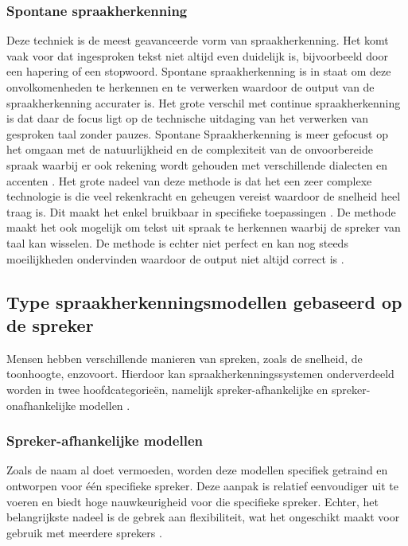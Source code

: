 \subsubsection{Spontane spraakherkenning}
Deze techniek is de meest geavanceerde vorm van spraakherkenning. Het komt vaak voor dat ingesproken tekst niet altijd even duidelijk is, bijvoorbeeld door een hapering of een stopwoord. Spontane spraakherkenning is in staat om deze onvolkomenheden te herkennen en te verwerken waardoor de output van de spraakherkenning accurater is. Het grote verschil met continue spraakherkenning is dat daar de focus ligt op de technische uitdaging van het verwerken van gesproken taal zonder pauzes. Spontane Spraakherkenning is meer gefocust op het omgaan met de natuurlijkheid en de complexiteit van de onvoorbereide spraak waarbij er ook rekening wordt gehouden met verschillende dialecten en accenten \autocite{Vimala2012}. Het grote nadeel van deze methode is dat het een zeer complexe technologie is die veel rekenkracht en geheugen vereist waardoor de snelheid heel traag is. Dit maakt het enkel bruikbaar in specifieke toepassingen \autocite{Hori2005}. De methode maakt het ook mogelijk om tekst uit spraak te herkennen waarbij de spreker van taal kan wisselen. De methode is echter niet perfect en kan nog steeds moeilijkheden ondervinden waardoor de output niet altijd correct is \autocite{Hori2005}.



\subsection{Type spraakherkenningsmodellen gebaseerd op de spreker}
Mensen hebben verschillende manieren van spreken, zoals de snelheid, de toonhoogte, enzovoort. Hierdoor kan spraakherkenningssystemen onderverdeeld worden in twee hoofdcategorieën, namelijk spreker-afhankelijke en spreker-onafhankelijke modellen \autocite{Vimala2012}.

\subsubsection{Spreker-afhankelijke modellen}
Zoals de naam al doet vermoeden, worden deze modellen specifiek getraind en ontworpen voor één specifieke spreker. Deze aanpak is relatief eenvoudiger uit te voeren en biedt hoge nauwkeurigheid voor die specifieke spreker. Echter, het belangrijkste nadeel is de gebrek aan flexibiliteit, wat het ongeschikt maakt voor gebruik met meerdere sprekers \autocite{Vimala2012}. 

